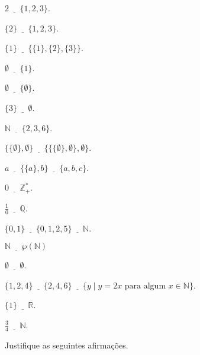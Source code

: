 \begin{exerList}
	\item $2 \underline{ \ \ \ \ \ \ } \{1, 2, 3\}$.
	\item $\{2\} \underline{ \ \ \ \ \ \ } \{1, 2, 3\}$.
	\item $\{1\} \underline{ \ \ \ \ \ \ } \{\{1\}, \{2\}, \{3\}\}$.
	\item $\emptyset \underline{ \ \ \ \ \ \ } \{1\}$.
	\item $\emptyset \underline{ \ \ \ \ \ \ } \{\emptyset\}$.
	\item $\{3\} \underline{ \ \ \ \ \ \ } \emptyset$.
	\item $\mathbb{N} \underline{ \ \ \ \ \ \ } \{2, 3, 6\}$.
	\item $\{\{\emptyset\}, \emptyset\} \underline{ \ \ \ \ \ \ } \{\{\{\emptyset\}, \emptyset\}, \emptyset\}$.
	\item $a \underline{ \ \ \ \ \ \ } \{\{a\}, b\} \underline{ \ \ \ \ \ \ } \{a, b, c\}$.
	\item $0 \underline{ \ \ \ \ \ \ }  \mathbb{Z}_+^*$.
	\item $\frac{1}{0} \underline{ \ \ \ \ \ \ }  \mathbb{Q}$.
	\item $\{0,1\} \underline{ \ \ \ \ \ \ } \{0,1, 2, 5\} \underline{ \ \ \ \ \ \ } \mathbb{N}$.
	\item $\mathbb{N} \underline{ \ \ \ \ \ \ } \wp(\mathbb{N})$
	\item $\emptyset \underline{ \ \ \ \ \ \ }  \emptyset$.
	\item $\{1, 2, 4\} \underline{ \ \ \ \ \ \ }  \{2, 4, 6\} \underline{ \ \ \ \ \ \ } \{y \mid y = 2x \mbox{ para algum } x \in \mathbb{N}\}$.
	\item $\{1\} \underline{ \ \ \ \ \ \ }  \mathbb{R}$.
	\item $\frac{3}{4} \underline{ \ \ \ \ \ \ }  \mathbb{N}$.
\end{exerList}

\begin{problem}\label{prob:Conjuntos8}
	Justifique as seguintes afirmações.
\end{problem}

